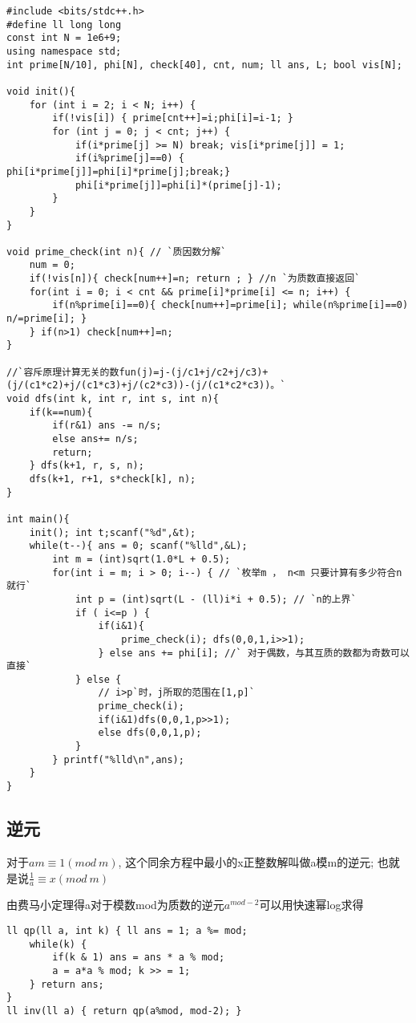 \begin{lstlisting}
#include <bits/stdc++.h>
#define ll long long
const int N = 1e6+9;
using namespace std;
int prime[N/10], phi[N], check[40], cnt, num; ll ans, L; bool vis[N];

void init(){
    for (int i = 2; i < N; i++) {
        if(!vis[i]) { prime[cnt++]=i;phi[i]=i-1; }
        for (int j = 0; j < cnt; j++) {
            if(i*prime[j] >= N) break; vis[i*prime[j]] = 1;
            if(i%prime[j]==0) { phi[i*prime[j]]=phi[i]*prime[j];break;}
            phi[i*prime[j]]=phi[i]*(prime[j]-1);
        }
    }
}

void prime_check(int n){ // `质因数分解`
    num = 0;
    if(!vis[n]){ check[num++]=n; return ; } //n `为质数直接返回`
    for(int i = 0; i < cnt && prime[i]*prime[i] <= n; i++) {
        if(n%prime[i]==0){ check[num++]=prime[i]; while(n%prime[i]==0) n/=prime[i]; }
    } if(n>1) check[num++]=n;
}

//`容斥原理计算无关的数fun(j)=j-(j/c1+j/c2+j/c3)+(j/(c1*c2)+j/(c1*c3)+j/(c2*c3))-(j/(c1*c2*c3))。`
void dfs(int k, int r, int s, int n){
    if(k==num){
        if(r&1) ans -= n/s;
        else ans+= n/s;
        return;
    } dfs(k+1, r, s, n);
    dfs(k+1, r+1, s*check[k], n);
}

int main(){
    init(); int t;scanf("%d",&t);
    while(t--){ ans = 0; scanf("%lld",&L);
        int m = (int)sqrt(1.0*L + 0.5);
        for(int i = m; i > 0; i--) { // `枚举m ， n<m 只要计算有多少符合n就行`
            int p = (int)sqrt(L - (ll)i*i + 0.5); // `n的上界`
            if ( i<=p ) {
                if(i&1){
                    prime_check(i); dfs(0,0,1,i>>1);
                } else ans += phi[i]; //` 对于偶数，与其互质的数都为奇数可以直接`
            } else {
                // i>p`时，j所取的范围在[1,p]`
                prime_check(i);
                if(i&1)dfs(0,0,1,p>>1);
                else dfs(0,0,1,p);
            }
        } printf("%lld\n",ans);
    }
}
\end{lstlisting}


\subsection{逆元}


对于$am \equiv 1 (mod \ m)$, 这个同余方程中最小的x正整数解叫做a模m的逆元; 也就是说$\frac{1}{a} \equiv x (mod \ m)$

由费马小定理得a对于模数mod为质数的逆元$a^{mod - 2}$可以用快速幂log求得

\begin{lstlisting}
ll qp(ll a, int k) { ll ans = 1; a %= mod;
    while(k) {
        if(k & 1) ans = ans * a % mod;
        a = a*a % mod; k >> = 1;
    } return ans;
}
ll inv(ll a) { return qp(a%mod, mod-2); }
\end{lstlisting}

